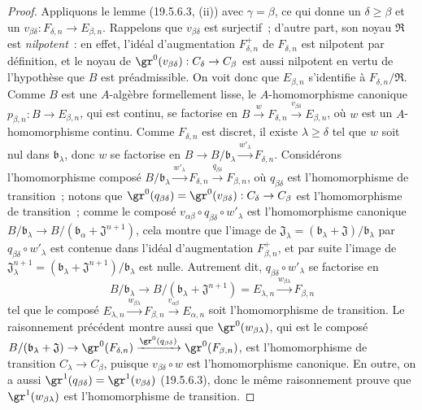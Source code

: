 \begin{proof}
Appliquons le lemme (19.5.6.3, (ii)) avec $\gamma=\beta$, ce qui donne un
$\delta\geq\beta$ et un
$v_{\beta\delta}:F_{\delta,n}\to E_{\beta,n}$. Rappelons que
$v_{\beta\delta}$ est surjectif~; d'autre part, son noyau $\mathfrak R$ est
\emph{nilpotent}~: en effet, l'idéal d'augmentation $F_{\delta,n}^+$ de
$F_{\delta,n}$ est nilpotent par définition, et le noyau de
$\gr^0(v_{\beta\delta}):C_\delta\to C_\beta$ est aussi nilpotent en vertu de
l'hypothèse que $B$ est préadmissible. On voit donc que $E_{\beta,n}$
s'identifie à $F_{\delta,n}/\mathfrak R$. Comme $B$ est une $A$-algèbre
formellement lisse, le $A$-homomorphisme canonique
$p_{\beta,n}:B\to E_{\beta,n}$, qui est continu, se factorise en
$B\xrightarrow{w}F_{\delta,n}\xrightarrow{v_{\beta\delta}}E_{\beta,n}$, où
$w$ est un $A$-homomorphisme continu. Comme $F_{\delta,n}$ est discret, il
existe $\lambda\geq\delta$ tel que $w$ soit nul dans $\mathfrak b_\lambda$,
donc $w$ se factorise en
$B\to B/\mathfrak b_\lambda\xrightarrow{w'_\lambda}F_{\delta,n}$. Considérons
l'homomorphisme composé
$B/\mathfrak b_\lambda\xrightarrow{w'_\lambda}F_{\delta,n}
\xrightarrow{q_{\beta\delta}}F_{\beta,n}$, où $q_{\beta\delta}$ est
l'homomorphisme de transition~; notons que
$\gr^0(q_{\beta\delta})=\gr^0(v_{\beta\delta}):C_\delta\to C_\beta$ est
l'homomorphisme de transition~; comme le composé
$v_{\alpha\beta}\circ q_{\beta\delta}\circ w'_\lambda$ est l'homomorphisme
canonique $B/\mathfrak b_\lambda\to
B/(\mathfrak b_\alpha+\mathfrak J^{n+1})$, cela montre que l'image de
$\mathfrak J_\lambda=(\mathfrak b_\lambda+\mathfrak J)/\mathfrak b_\lambda$
par $q_{\beta\delta}\circ w'_\lambda$ est contenue dans l'idéal d'augmentation
$F_{\beta,n}^+$, et par suite l'image de
$\mathfrak J_\lambda^{n+1}=(\mathfrak b_\lambda+\mathfrak J^{n+1})/
\mathfrak b_\lambda$ est nulle. Autrement dit,
$q_{\beta\delta}\circ w'_\lambda$ se factorise en
\[
  B/\mathfrak b_\lambda\to
  B/(\mathfrak b_\lambda+\mathfrak J^{n+1})=E_{\lambda,n}
  \xrightarrow{w_{\beta\lambda}}F_{\beta,n}
\]
tel que le composé
$E_{\lambda,n}\xrightarrow{w_{\beta\lambda}}F_{\beta,n}
\xrightarrow{v_{\alpha\beta}}E_{\alpha,n}$ soit l'homomorphisme de transition.
Le raisonnement précédent montre aussi que $\gr^0(w_{\beta\lambda})$, qui est
le composé
$B/(\mathfrak b_\lambda+\mathfrak J)\to\gr^0(F_{\delta,n})
\xrightarrow{\gr^0(q_{\beta\delta})}\gr^0(F_{\beta,n})$, est l'homomorphisme
de transition $C_\lambda\to C_\beta$, puisque
$v_{\beta\delta}\circ w$ est l'homomorphisme canonique. En outre, on a aussi
$\gr^1(q_{\beta\delta})=\gr^1(v_{\beta\delta})$ (19.5.6.3), donc le même
raisonnement prouve que $\gr^1(w_{\beta\lambda})$ est l'homomorphisme de
transition.
\end{proof}

